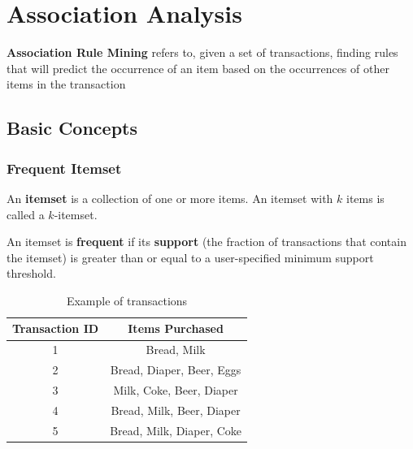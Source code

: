 \chapter{Association Analysis}

\textbf{Association Rule Mining} refers to, given a set of transactions, finding rules that will predict the occurrence of an item based on the occurrences of other items in the transaction

\section{Basic Concepts}

\subsection{Frequent Itemset}
An \textbf{itemset} is a collection of one or more items. An itemset with $k$ items is called a $k$-itemset.

An itemset is \textbf{frequent} if its \textbf{support} (the fraction of transactions that contain the itemset) is greater than or equal to a user-specified minimum support threshold.

\begin{table}[htbp]
   \centering
   \begin{tabular}{|c|c|}
      \hline
      Transaction ID & Items Purchased \\
      \hline
      1              & Bread, Milk         \\
      2              & Bread, Diaper, Beer, Eggs            \\
      3              & Milk, Coke, Beer, Diaper            \\
      4              & Bread, Milk, Beer, Diaper         \\
      5              & Bread, Milk, Diaper, Coke            \\
      \hline
   \end{tabular}
   \caption{Example of transactions}
   \label{tab:itemset}
\end{table}


